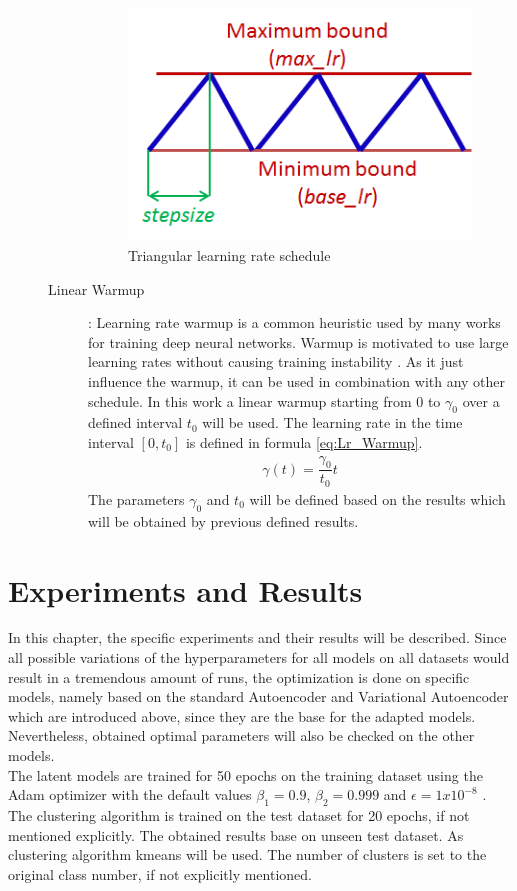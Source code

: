 \documentclass[12pt,DIV14,BCOR12mm,a4paper,footexclude,headinclude,halfparskip-,twoside,openright,openany,cleardoubleempty,idxtotoc,bibtotoc]{scrreprt} %
\numberwithin{equation}{chapter}
\begin{document}
\begin{description}
\begin{description}
		\begin{figure}[htb!]
			\centering
			\includegraphics[width=0.3\linewidth]{Graphiken/triangularWindow}
			\caption{Triangular learning rate schedule \cite{Smith15CyclicLearningRate}}
			\label{fig:Triangular Learning rate}
		\end{figure}
		\item[Linear Warmup]: Learning rate warmup is a common heuristic used by many works for training deep neural networks. Warmup is motivated to use large learning rates without causing training instability \cite{gotmare2018Warmup}. As it just influence the warmup, it can be used in combination with any other schedule. In this work a linear warmup starting from $0$ to $\gamma_0$ over a defined interval $t_0$ will be used. The learning rate in the time interval $[0, t_0]$ is defined in formula \ref{eq:Lr_Warmup}.
		\begin{align}
			\gamma(t) = \dfrac{\gamma_0}{t_0}t\label{eq:Lr_Warmup}
		\end{align}
		The parameters $\gamma_0$ and $t_0$ will be defined based on the results which will be obtained by previous defined results.
	\end{description}
\end{description}
\chapter{Experiments and Results}
In this chapter, the specific experiments and their results will be described. Since all possible variations of the hyperparameters for all models on all datasets would result in a tremendous amount of runs, the optimization is done on specific models, namely based on the standard Autoencoder and Variational Autoencoder which are introduced above, since they are the base for the adapted models. Nevertheless, obtained optimal parameters will also be checked on the other models.\\
The latent models are trained for 50 epochs on the training dataset using the Adam optimizer with the default values $\beta_1=0.9$, $\beta_2=0.999$ and $\epsilon = 1x10^{-8}$ \cite{Kingma14AdamOptimizer}. The clustering algorithm is trained on the test dataset for 20 epochs, if not mentioned explicitly. The obtained results base on unseen test dataset. As clustering algorithm kmeans will be used. The number of clusters is set to the original class number, if not explicitly mentioned.\\
\end{document}
